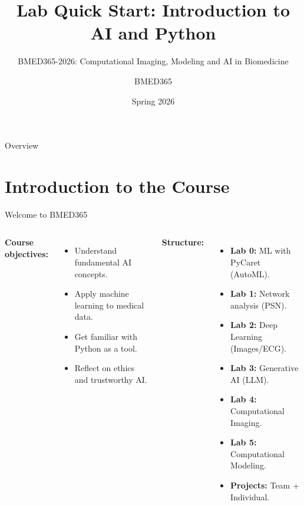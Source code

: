 \documentclass[aspectratio=169]{beamer}
\title{Lab Quick Start: Introduction to AI and Python}
\subtitle{BMED365-2026: Computational Imaging, Modeling and AI in Biomedicine}
\author{BMED365}
\date{Spring 2026}
\begin{document}
\frame{\titlepage}

\begin{frame}{Overview}
    \tableofcontents
\end{frame}

\section{Introduction to the Course}
\begin{frame}{Welcome to BMED365}
    \begin{columns}
        \textbf{Course objectives:}
        \begin{itemize}
            \item Understand fundamental AI concepts.
            \item Apply machine learning to medical data.
            \item Get familiar with Python as a tool.
            \item Reflect on ethics and trustworthy AI.
        \end{itemize}
        
        \textbf{Structure:}
        \begin{itemize}
            \item \textbf{Lab 0:} ML with PyCaret (AutoML).
            \item \textbf{Lab 1:} Network analysis (PSN).
            \item \textbf{Lab 2:} Deep Learning (Images/ECG).
            \item \textbf{Lab 3:} Generative AI (LLM).
            \item \textbf{Lab 4:} Computational Imaging.
            \item \textbf{Lab 5:} Computational Modeling.
            \item \textbf{Projects:} Team + Individual.
        \end{itemize}
    \end{columns}
\end{frame}
\end{document}
